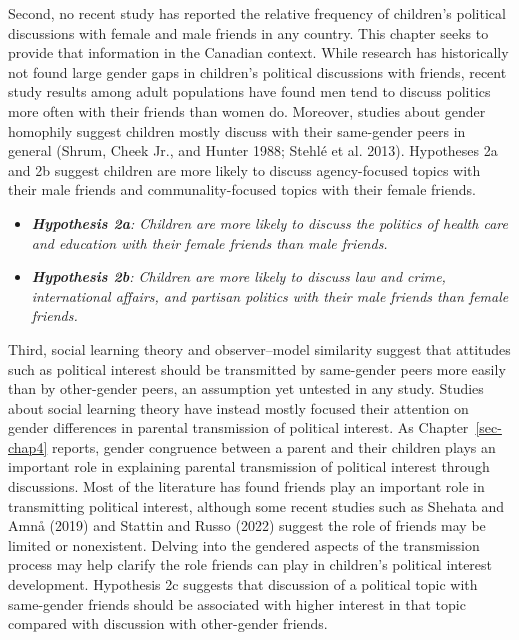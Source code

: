 \documentclass[
  letterpaper,
  DIV=11,
  numbers=noendperiod]{scrreprt}
\begin{document}
Second, no recent study has reported the relative frequency of
children's political discussions with female and male friends in any
country. This chapter seeks to provide that information in the Canadian
context. While research has historically not found large gender gaps in
children's political discussions with friends, recent study results
among adult populations have found men tend to discuss politics more
often with their friends than women do. Moreover, studies about gender
homophily suggest children mostly discuss with their same-gender peers
in general (Shrum, Cheek Jr., and Hunter 1988; Stehlé et al. 2013).
Hypotheses 2a and 2b suggest children are more likely to discuss
agency-focused topics with their male friends and communality-focused
topics with their female friends.

\begin{itemize}
\item
  \emph{\textbf{Hypothesis 2a}: Children are more likely to discuss the
  politics of health care and education with their female friends than
  male friends.}
\item
  \emph{\textbf{Hypothesis 2b}: Children are more likely to discuss law
  and crime, international affairs, and partisan politics with their
  male friends than female friends.}
\end{itemize}

Third, social learning theory and observer--model similarity suggest
that attitudes such as political interest should be transmitted by
same-gender peers more easily than by other-gender peers, an assumption
yet untested in any study. Studies about social learning theory have
instead mostly focused their attention on gender differences in parental
transmission of political interest. As Chapter~\ref{sec-chap4} reports,
gender congruence between a parent and their children plays an important
role in explaining parental transmission of political interest through
discussions. Most of the literature has found friends play an important
role in transmitting political interest, although some recent studies
such as Shehata and Amnå (2019) and Stattin and Russo (2022) suggest the
role of friends may be limited or nonexistent. Delving into the gendered
aspects of the transmission process may help clarify the role friends
can play in children's political interest development. Hypothesis 2c
suggests that discussion of a political topic with same-gender friends
should be associated with higher interest in that topic compared with
discussion with other-gender friends.
\end{document}
